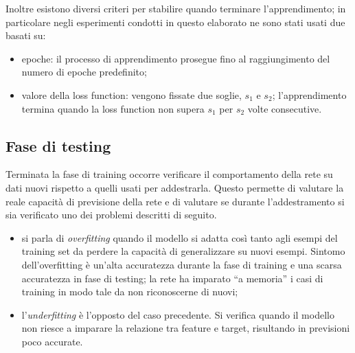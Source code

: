 \documentclass[12pt]{report}
\begin{document}
Inoltre esistono diversi criteri per stabilire quando terminare l'apprendimento; in particolare negli esperimenti condotti in questo elaborato ne sono stati usati due basati su:
\begin{itemize}
\item{epoche}: il processo di apprendimento prosegue fino al raggiungimento del numero di epoche predefinito;
\item{valore della loss function}: vengono fissate due soglie, $s_1$ e $s_2$; l'apprendimento termina quando la loss function non supera $s_1$ per $s_2$ volte consecutive.
\end{itemize}

\subsection{Fase di testing}
Terminata la fase di training occorre verificare il comportamento della rete su dati nuovi rispetto a quelli usati per addestrarla. Questo permette di valutare la reale capacità di previsione della rete e di valutare se durante l'addestramento si sia verificato uno dei problemi descritti di seguito.
\begin{itemize}
\item{si parla di \textit{overfitting} quando il modello si adatta così tanto agli esempi del training set da perdere la capacità di generalizzare su nuovi esempi. Sintomo dell'overfitting è un'alta accuratezza durante la fase di training e una scarsa accuratezza in fase di testing; la rete ha imparato ``a memoria'' i casi di training in modo tale da non riconoscerne di nuovi};
\item{l'\textit{underfitting} è l'opposto del caso precedente. Si verifica quando il modello non riesce a imparare la relazione tra feature e target, risultando in previsioni poco accurate}.
\end{itemize}
\end{document}
